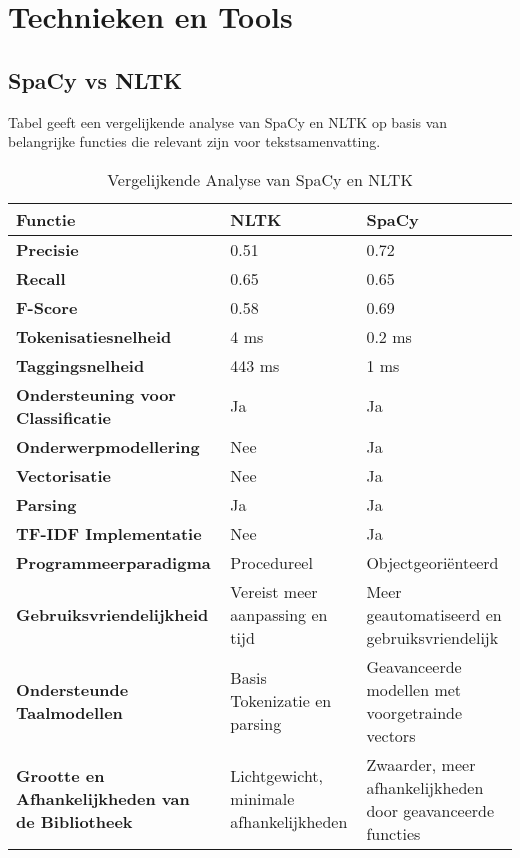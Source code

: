 \section{Technieken en Tools}
\subsection{SpaCy vs NLTK}
Tabel geeft een vergelijkende analyse van SpaCy en NLTK op basis van belangrijke functies die relevant zijn voor tekstsamenvatting.
\autocite{amade2024automatic}
\begin{table}[h!]
    \centering
    \begin{tabular}{|p{4cm}|p{5cm}|p{5cm}|}
        \hline
        \textbf{Functie} & \textbf{NLTK} & \textbf{SpaCy} \\ \hline
        \textbf{Precisie} & 0.51 & 0.72 \\ \hline
        \textbf{Recall} & 0.65 & 0.65 \\ \hline
        \textbf{F-Score} & 0.58 & 0.69 \\ \hline
        \textbf{Tokenisatiesnelheid} & 4 ms & 0.2 ms \\ \hline
        \textbf{Taggingsnelheid} & 443 ms & 1 ms \\ \hline
        \textbf{Ondersteuning voor Classificatie} & Ja & Ja \\ \hline
        \textbf{Onderwerpmodellering} & Nee & Ja \\ \hline
        \textbf{Vectorisatie} & Nee & Ja \\ \hline
        \textbf{Parsing} & Ja & Ja \\ \hline
        \textbf{TF-IDF Implementatie} & Nee & Ja \\ \hline
        \textbf{Programmeerparadigma} & Procedureel & Objectgeoriënteerd \\ \hline
        \textbf{Gebruiksvriendelijkheid} & Vereist meer aanpassing en tijd & Meer geautomatiseerd en gebruiksvriendelijk \\ \hline
        \textbf{Ondersteunde Taalmodellen} & Basis Tokenizatie en parsing & Geavanceerde modellen met voorgetrainde vectors \\ \hline
        \textbf{Grootte en Afhankelijkheden van de Bibliotheek} & Lichtgewicht, minimale afhankelijkheden & Zwaarder, meer afhankelijkheden door geavanceerde functies \\ \hline
    \end{tabular}
    \caption{Vergelijkende Analyse van SpaCy en NLTK}
    \label{tab:comparison}
\end{table}


